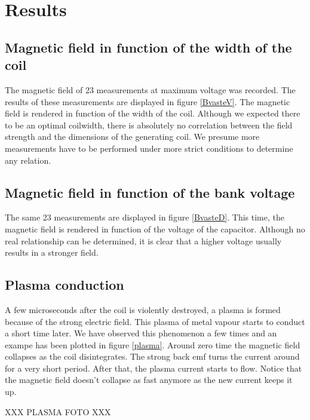 \section{Results}

\subsection{Magnetic field in function of the width of the coil}

The magnetic field of 23 measurements at maximum voltage was recorded. The 
results of these measurements are displayed in figure \ref{BvasteV}. The 
magnetic field is rendered in function of the width of the coil. Although we 
expected there to be an optimal coilwidth, there is absolutely no correlation 
between the field strength and the dimensions of the generating coil. We 
presume more measurements have to be performed under more strict conditions to 
determine any relation.


\subsection{Magnetic field in function of the bank voltage}

The same 23 measurements are displayed in figure \ref{BvasteD}. This time, the 
magnetic field is rendered in function of the voltage of the capacitor.  
Although no real relationship can be determined, it is clear that a higher 
voltage usually results in a stronger field.


\subsection{Plasma conduction}

A few microseconds after the coil is violently destroyed, a plasma is formed 
because of the strong electric field. This plasma of metal vapour starts to 
conduct a short time later. We have observed this phenomenon a few times and an 
exampe has been plotted in figure \ref{plasma}. Around zero time the magnetic 
field collapses as the coil disintegrates. The strong back emf turns the 
current around for a very short period. After that, the plasma current starts 
to flow. Notice that the magnetic field doesn't collapse as fast anymore as the 
new current keeps it up.

XXX PLASMA FOTO XXX

